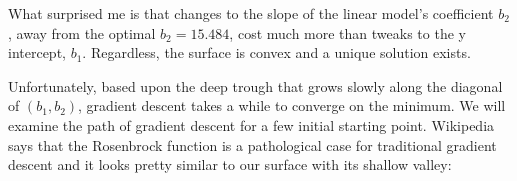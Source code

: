 \begin{fullwidth}
\noindent {}

What surprised me is that changes to the slope of the linear model's coefficient $b_2$, away from the optimal $b_2=15.484$, cost much more than tweaks to the y intercept, $b_1$. Regardless, the surface is convex and a unique solution exists. 

Unfortunately, based upon the deep trough that grows slowly along the diagonal of $(b_1,b_2)$, gradient descent takes a while to converge on the minimum. We will examine the path of gradient descent for a few initial starting point. Wikipedia says that the Rosenbrock function is a pathological case for traditional gradient descent and it looks pretty similar to our surface with its shallow valley:


\end{fullwidth}
